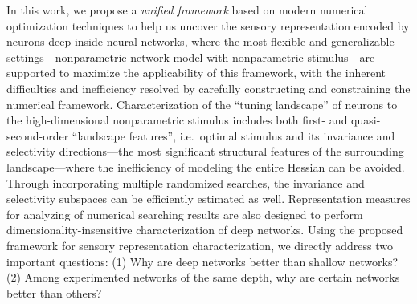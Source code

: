 In this work, we propose a \emph{unified framework} based on modern numerical optimization techniques to help us uncover the sensory representation encoded by neurons deep inside neural networks, where the most flexible and generalizable settings---nonparametric network model with nonparametric stimulus---are supported to maximize the applicability of this framework, with the inherent difficulties and inefficiency resolved by carefully constructing and constraining the numerical framework. Characterization of the ``tuning landscape'' of neurons to the high-dimensional nonparametric stimulus includes both first- and quasi-second-order ``landscape features'', i.e.~optimal stimulus and its invariance and selectivity directions---the most significant structural features of the surrounding landscape---where the inefficiency of modeling the entire Hessian can be avoided. Through incorporating multiple randomized searches, the invariance and selectivity subspaces can be efficiently estimated as well. Representation measures for analyzing of numerical searching results are also designed to perform dimensionality-insensitive characterization of deep networks. Using the proposed framework for sensory representation characterization, we directly address two important questions: (1) Why are deep networks better than shallow networks? (2) Among experimented networks of the same depth, why are certain networks better than others? %

